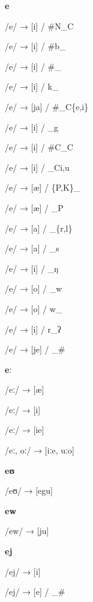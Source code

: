 \begin{center}\textbf{e}\end{center}
\begin{multicols}{4}
\noindent /e/ → [i] / \#N\_C

\noindent /e/ → [i] / \#b\_

\noindent /e/ → [i] / \#\_

\noindent /e/ → [i] / k\_

\noindent /e/ → [ja] / \#\_C\{e,i\}

\noindent /e/ → [i] / \_g

\noindent /e/ → [i] / \#C\_C

\noindent /e/ → [i] / \_C{i,u}

\noindent /e/ → [æ] / \{P,K\}\_

\noindent /e/ → [æ] / \_P

\noindent /e/ → [a] / \_\{r,l\}

\noindent /e/ → [a] / \_s

\noindent /e/ → [i] / \_ŋ

\noindent /e/ → [o] / \_w

\noindent /e/ → [o] / w\_

\noindent /e/ → [i] / r\_ʔ

\noindent /e/ → [je] / \_\#
\end{multicols}


\begin{center}\textbf{eː}\end{center}
\begin{multicols}{4}
\noindent /eː/ → [æ]

\noindent /eː/ → [i]

\noindent /eː/ → [ie]

\noindent /eː, oː/ → [iːe, uːo]
\end{multicols}

\begin{center}\textbf{eʊ}\end{center}
\begin{multicols}{4}
\noindent /eʊ/ → [egu]
\end{multicols}


\begin{center}\textbf{ew}\end{center}
\begin{multicols}{4}
\noindent /ew/ → [ju]
\end{multicols}


\begin{center}\textbf{ej}\end{center}
\begin{multicols}{4}
\noindent /ej/ → [i]

\noindent /ej/ → [e] / \_\#
\end{multicols}


